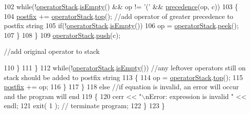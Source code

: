 \begin{DoxyCode}
{            }
102                \textcolor{keywordflow}{while}(!\hyperlink{classAlgebraicExpression_a863ef1cc73b9b3b49c199f1564cbcc2e}{operatorStack}.\hyperlink{classStack_ad0db0d9b249e871bb7504ed89a99d3a7}{isEmpty}() && op != \textcolor{charliteral}{'('} && 
      \hyperlink{classAlgebraicExpression_a59e33cea19abab195b1c755347d07bf5}{precedence}(op, c))
103                \{
104                   \hyperlink{classAlgebraicExpression_a0c9827f84bf13c0f0f4a096e72462a44}{postfix} += \hyperlink{classAlgebraicExpression_a863ef1cc73b9b3b49c199f1564cbcc2e}{operatorStack}.\hyperlink{classStack_ad461f6de40c8672dbf743068f4515061}{top}(); \textcolor{comment}{//add operator of greater
       precedence to postfix string                                                                                        
                  }
105                   \textcolor{keywordflow}{if}(!\hyperlink{classAlgebraicExpression_a863ef1cc73b9b3b49c199f1564cbcc2e}{operatorStack}.\hyperlink{classStack_ad0db0d9b249e871bb7504ed89a99d3a7}{isEmpty}())
106                      op = \hyperlink{classAlgebraicExpression_a863ef1cc73b9b3b49c199f1564cbcc2e}{operatorStack}.\hyperlink{classStack_adcb4774ac8aa94cbc19b461da9bdee3a}{peek}();
107                \}
108             \}
109             \hyperlink{classAlgebraicExpression_a863ef1cc73b9b3b49c199f1564cbcc2e}{operatorStack}.\hyperlink{classStack_a3553a0aa2c9640c5266e4d8790863e2e}{push}(c); \textcolor{comment}{//add original operator to stack                       
                                                                                                                  
            }
110          \}
111       \}
112       \textcolor{keywordflow}{while}(!\hyperlink{classAlgebraicExpression_a863ef1cc73b9b3b49c199f1564cbcc2e}{operatorStack}.\hyperlink{classStack_ad0db0d9b249e871bb7504ed89a99d3a7}{isEmpty}()) \textcolor{comment}{//any leftover operators still on stack should be
       added to postfix string                                                                                    
               }
113       \{
114          op = \hyperlink{classAlgebraicExpression_a863ef1cc73b9b3b49c199f1564cbcc2e}{operatorStack}.\hyperlink{classStack_ad461f6de40c8672dbf743068f4515061}{top}();
115          \hyperlink{classAlgebraicExpression_a0c9827f84bf13c0f0f4a096e72462a44}{postfix} += op;
116       \}
117    \}
118    \textcolor{keywordflow}{else} \textcolor{comment}{//if equation is invalid, an error will occur and the program will end                             
                                                                                                       }
119    \{
120       cerr << \textcolor{stringliteral}{"\(\backslash\)nError: expression is invalid "} << endl;
121       exit( 1 ); \textcolor{comment}{// terminate program;                                                                     
                                                                                                       }
122    \}
123 \}
\end{DoxyCode}


